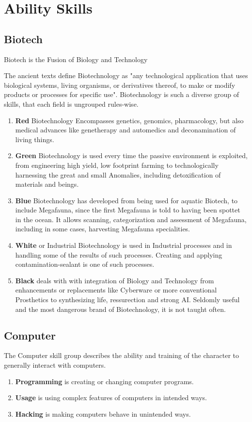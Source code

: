 \section{Ability Skills}\label{sec:ability-skills}
\subsection{Biotech}\label{subsec:biotech}
Biotech is the Fusion of Biology and Technology \par
The ancient texts define Biotechnology as "any technological application that uses biological systems, living organisms,
or derivatives thereof, to make or modify products or processes for specific use".
Biotechnology is such a diverse group of skills, that each field is ungrouped rules-wise.
\begin{enumerate}[label= -]
    \item \textbf{Red} Biotechnology Encompasses genetics, genomics, pharmacology, but also medical advances like
    genetherapy and automedics and deconamination of living things.
    \item \textbf{Green} Biotechnology is used every time the passive environment is exploited,
    from engineering high yield, low footprint farming to technologically harnessing the great and small Anomalies,
    including detoxification of materials and beings.
    \item \textbf{Blue} Biotechnology has developed from being used for aquatic Biotech, to include Megafauna, since the
    first Megafauna is told to having been spottet in the ocean.
    It allows scanning, categorization and assessment of Megafauna, including in some cases,
    harvesting Megafauna specialities.
    \item \textbf{White} or Industrial Biotechnology  is used in Industrial processes and in handling some of the
    results of such processes.
    Creating and applying contamination-sealant is one of such processes.
    \item \textbf{Black} deals with with integration of Biology and Technology from enhancements or replacements like
    Cyberware or more conventional Prosthetics to synthesizing life, ressurection and strong AI. Seldomly useful
    and the most dangerous brand of Biotechnology, it is not taught often.
\end{enumerate}
\subsection{Computer}\label{subsec:computer}
The Computer skill group describes the ability and training of the character to generally interact with computers.
\begin{enumerate}[label= -]
    \item \textbf{Programming} is creating or changing computer programs.
    \item \textbf{Usage} is using complex features of computers in intended ways.
    \item \textbf{Hacking} is making computers behave in unintended ways.
\end{enumerate}
